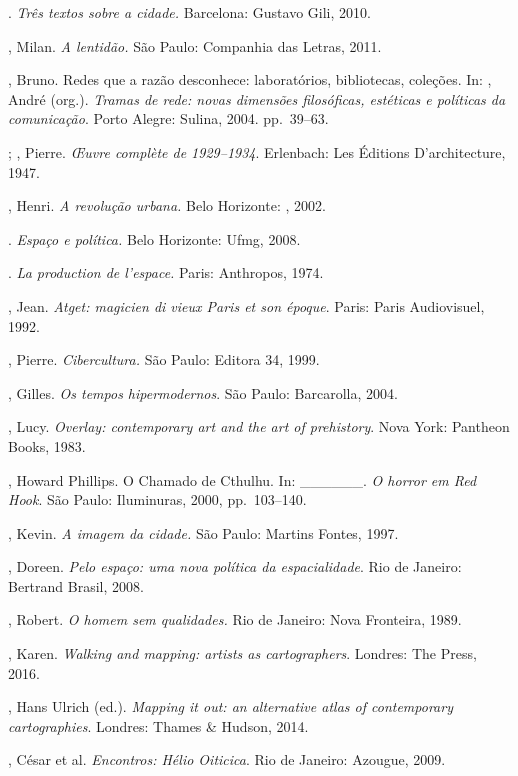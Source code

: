 \begin{bibliohedra}
\tit{\_\_\_\_\_\_}. \emph{Três textos sobre a cidade.} Barcelona:
Gustavo Gili, 2010.

, Milan. \emph{A lentidão.} São Paulo: Companhia das Letras,
2011.

, Bruno. Redes que a razão desconhece: laboratórios,
bibliotecas, coleções. In: , André (org.). \emph{Tramas de
rede: novas dimensões filosóficas, estéticas e políticas da
comunicação}. Porto Alegre: Sulina, 2004. pp.~39--63.

; , Pierre. \emph{\OE uvre complète de 1929--1934}.
Erlenbach: Les Éditions D'architecture, 1947.

, Henri. \emph{A revolução urbana.} Belo Horizonte: ,
2002.

\tit{\_\_\_\_\_\_}. \emph{Espaço e política.} Belo Horizonte: Ufmg, 2008.

\tit{\_\_\_\_\_\_}. \emph{La production de l'espace.} Paris: Anthropos, 1974.

, Jean. \emph{Atget: magicien di vieux Paris et son époque}.
Paris: Paris Audiovisuel, 1992.

, Pierre. \emph{Cibercultura.} São Paulo: Editora 34, 1999.

, Gilles. \emph{Os tempos hipermodernos}. São Paulo: Barcarolla, 2004.

, Lucy. \emph{Overlay: contemporary art and the art of
prehistory}. Nova York: Pantheon Books, 1983.

, Howard Phillips. O Chamado de Cthulhu. In: \_\_\_\_\_\_. \emph{O horror em Red Hook}. São Paulo: Iluminuras, 2000, pp.~103--140.

, Kevin. \emph{A imagem da cidade.} São Paulo: Martins Fontes,
1997.

, Doreen. \emph{Pelo espaço: uma nova política da
espacialidade}. Rio de Janeiro: Bertrand Brasil, 2008.

, Robert. \emph{O homem sem qualidades.} Rio de Janeiro: Nova
Fronteira, 1989.

, Karen. \emph{Walking and mapping: artists as cartographers}.
Londres: The  Press, 2016.

, Hans Ulrich (ed.). \emph{Mapping it out: an alternative atlas
of contemporary cartographies}. Londres: Thames \& Hudson, 2014.

, César et al. \emph{Encontros: Hélio Oiticica}. Rio de
Janeiro: Azougue, 2009.


\end{bibliohedra}
